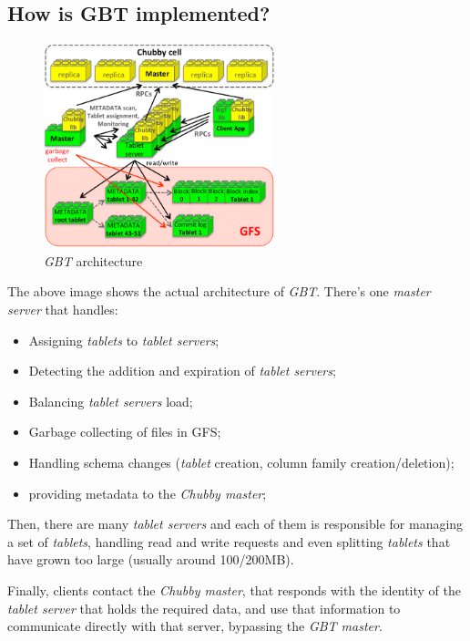 \subsection{How is GBT implemented?}
\begin{figure}[h!]
    \centering
    \includegraphics[width=0.6\textwidth]{images/gbt-design-detailed.png}
    \caption{\emph{GBT} architecture}
\end{figure}

\noindent
The above image shows the actual architecture of \emph{GBT}. There's one
\emph{master server} that handles:
\begin{itemize}
    \item Assigning \emph{tablets} to \emph{tablet servers};
    \item Detecting the addition and expiration of \emph{tablet servers};
    \item Balancing \emph{tablet servers} load;
    \item Garbage collecting of files in GFS;
    \item Handling schema changes (\emph{tablet} creation, column family
    creation/deletion);
    \item providing metadata to the \emph{Chubby master};
\end{itemize}
Then, there are many \emph{tablet servers} and each of them is responsible for
managing a set of \emph{tablets}, handling read and write requests and even splitting
\emph{tablets} that have grown too large (usually around 100/200MB).

Finally, clients contact the \emph{Chubby master}, that responds with the
identity of the \emph{tablet server} that holds the required data, and use that
information to communicate directly with that server, bypassing the \emph{GBT
master}.

